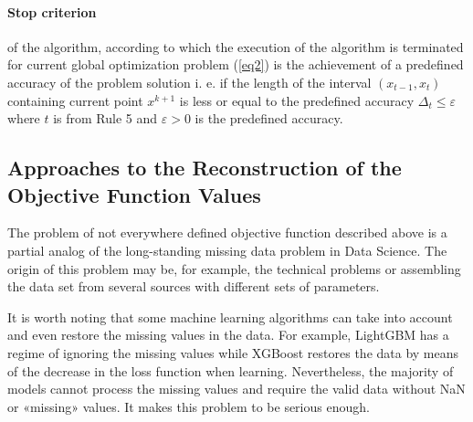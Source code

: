 \documentclass[runningheads]{llncs}
\begin{document}
\paragraph{Stop criterion} of the algorithm, according to which the execution of the algorithm is terminated for current global optimization problem (\ref{eq2}) is the achievement of a predefined accuracy of the problem solution i. e. if the length of the interval $(x_{t-1},x_t)$ containing current point $x^{k+1}$ is less or equal to the predefined accuracy $\Delta _t \leq \varepsilon$ where $t$ is from Rule 5 and $\varepsilon >0$ is the predefined accuracy.

\subsection{ Approaches to the Reconstruction of the Objective Function Values }
The problem of not everywhere defined objective function described above is a partial analog of the long-standing missing data problem in Data Science. The origin of this problem may be, for example, the technical problems or assembling the data set from several sources with different sets of parameters.

It is worth noting that some machine learning algorithms can take into account and even restore the missing values in the data. For example, LightGBM has a regime of ignoring the missing values while XGBoost restores the data by means of the decrease in the loss function when learning. Nevertheless, the majority of models cannot process the missing values and require the valid data without NaN or «missing» values. It makes this problem to be serious enough.
\end{document}
